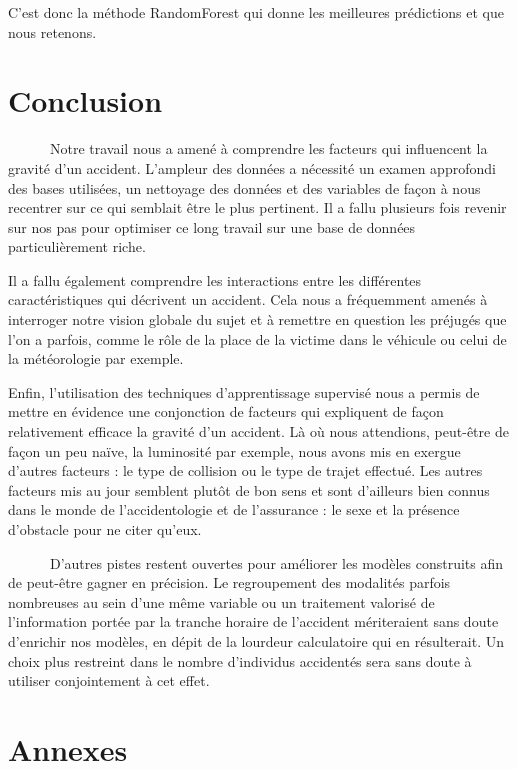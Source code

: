 \documentclass[french,]{tp}
\begin{document}
C'est donc la méthode RandomForest qui donne les meilleures prédictions et que nous retenons.

\newpage

\hypertarget{conclusion}{%
\section{Conclusion}\label{conclusion}}

~~~~~~Notre travail nous a amené à comprendre les facteurs qui influencent la gravité d'un accident. L'ampleur des données a nécessité un examen approfondi des bases utilisées, un nettoyage des données et des variables de façon à nous recentrer sur ce qui semblait être le plus pertinent. Il a fallu plusieurs fois revenir sur nos pas pour optimiser ce long travail sur une base de données particulièrement riche.

Il a fallu également comprendre les interactions entre les différentes caractéristiques qui décrivent un accident. Cela nous a fréquemment amenés à interroger notre vision globale du sujet et à remettre en question les préjugés que l'on a parfois, comme le rôle de la place de la victime dans le véhicule ou celui de la météorologie par exemple.

Enfin, l'utilisation des techniques d'apprentissage supervisé nous a permis de mettre en évidence une conjonction de facteurs qui expliquent de façon relativement efficace la gravité d'un accident. Là où nous attendions, peut-être de façon un peu naïve, la luminosité par exemple, nous avons mis en exergue d'autres facteurs : le type de collision ou le type de trajet effectué. Les autres facteurs mis au jour semblent plutôt de bon sens et sont d'ailleurs bien connus dans le monde de l'accidentologie et de l'assurance : le sexe et la présence d'obstacle pour ne citer qu'eux.

~~~~~~D'autres pistes restent ouvertes pour améliorer les modèles construits afin de peut-être gagner en précision. Le regroupement des modalités parfois nombreuses au sein d'une même variable ou un traitement valorisé de l'information portée par la tranche horaire de l'accident mériteraient sans doute d'enrichir nos modèles, en dépit de la lourdeur calculatoire qui en résulterait. Un choix plus restreint dans le nombre d'individus accidentés sera sans doute à utiliser conjointement à cet effet.

\newpage

\hypertarget{appendix-annexes}{%
\appendix}


\hypertarget{annexes}{%
\section{Annexes}\label{annexes}}
\end{document}
